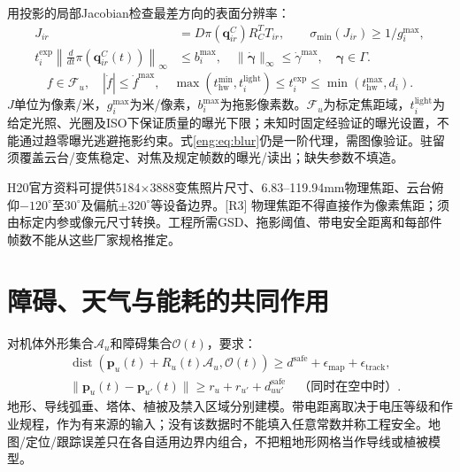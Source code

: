 \noindent 用投影的局部Jacobian检查最差方向的表面分辨率：
\begin{align}
 J_{ir}&=D\pi(\mathbf q^C_{ir})R_C^TT_{ir},\qquad
 \sigma_{\min}(J_{ir})\ge1/g_i^{\max},\label{eng:eq:gsd}\\
 t_i^{\mathrm{exp}}\left\|\frac{d}{dt}\pi(\mathbf q^C_{ir}(t))\right\|_\infty
 &\le b_i^{\max},\quad
 \|\dot{\boldsymbol\gamma}\|_\infty\le\dot\gamma^{\max},\quad
 \boldsymbol\gamma\in\Gamma.\label{eng:eq:blur}
\end{align}
\begin{equation}
 f\in\mathcal F_u,\quad |\dot f|\le\dot f^{\max},\quad
 \max(t_{\mathrm{hw}}^{\min},t_i^{\mathrm{light}})\le t_i^{\mathrm{exp}}
 \le\min(t_{\mathrm{hw}}^{\max},d_i).\label{eng:eq:exposure}
\end{equation}
\noindent $J$单位为像素/米，$g_i^{\max}$为米/像素，$b_i^{\max}$为拖影像素数。$\mathcal F_u$为标定焦距域，$t_i^{\mathrm{light}}$为给定光照、光圈及ISO下保证质量的曝光下限；未知时固定经验证的曝光设置，不能通过趋零曝光逃避拖影约束。式\eqref{eng:eq:blur}仍是一阶代理，需图像验证。驻留须覆盖云台/变焦稳定、对焦及规定帧数的曝光/读出；缺失参数不填造。

\noindent H20官方资料可提供5184$\times$3888变焦照片尺寸、6.83--119.94mm物理焦距、云台俯仰$-120^\circ$至$30^\circ$及偏航$\pm320^\circ$等设备边界。[R3] 物理焦距不得直接作为像素焦距；须由标定内参或像元尺寸转换。工程所需GSD、拖影阈值、带电安全距离和每部件帧数不能从这些厂家规格推定。
\clearpage

\section{障碍、天气与能耗的共同作用}
\noindent 对机体外形集合$\mathcal A_u$和障碍集合$\mathcal O(t)$，要求：
\begin{align}
 &\operatorname{dist}(\mathbf p_u(t)+R_u(t)\mathcal A_u,\mathcal O(t))
 \ge d^{\mathrm{safe}}+\epsilon_{\mathrm{map}}+\epsilon_{\mathrm{track}},\\
 &\|\mathbf p_u(t)-\mathbf p_{u'}(t)\|\ge r_u+r_{u'}+d_{uu'}^{\mathrm{safe}}
 \quad\text{（同时在空中时）}.\label{eng:eq:collision}
\end{align}
\noindent 地形、导线弧垂、塔体、植被及禁入区域分别建模。带电距离取决于电压等级和作业规程，作为有来源的输入；没有该数据时不能填入任意常数并称工程安全。地图/定位/跟踪误差只在各自适用边界内组合，不把粗地形网格当作导线或植被模型。

